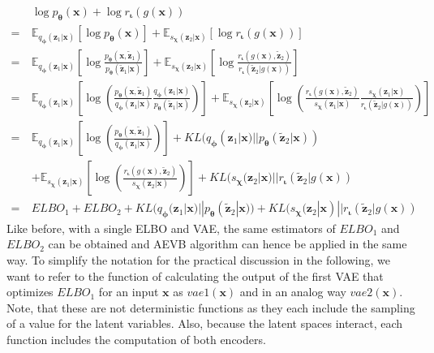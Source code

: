 \documentclass[12pt]{report}
\theoremstyle{definition}
\begin{document}
\begin{equation}
\begin{split}
 & \log p_{\pmb{\theta}}(\mathbf{x}) + \log r_{\pmb{\iota}}(g(\mathbf{x}))   \\
	= \ & \mathbb{E}_{q_{\pmb{\phi}}(\mathbf{z}_1|\mathbf{x})}\left[\log p_{\pmb{\theta}}(\mathbf{x})\right] + \mathbb{E}_{s_{\pmb{\chi}}(\mathbf{z}_2|\mathbf{x})}\left[\log r_{\pmb{\iota}}(g(\mathbf{x}))\right] \\
	= \ & \mathbb{E}_{q_{\pmb{\phi}}(\mathbf{z}_1|\mathbf{x})}\left[ \log \frac{p_{\pmb{\theta}}(\mathbf{x}, \tilde{\mathbf{z}}_1)}{p_{\pmb{\theta}}(\tilde{\mathbf{z}}_1|\mathbf{x})} \right]
	+ \mathbb{E}_{s_{\pmb{\chi}}(\mathbf{z}_2|\mathbf{x})}\left[ \log \frac{r_{\pmb{\iota}}(g(\mathbf{x}), \tilde{\mathbf{z}}_2)}{r_{\pmb{\iota}}(\tilde{\mathbf{z}}_2|g(\mathbf{x}))} \right] \\
	= \ & \mathbb{E}_{q_{\pmb{\phi}}(\mathbf{z}_1|\mathbf{x})}\left[ \log \left( \frac{p_{\pmb{\theta}}(\mathbf{x}, \tilde{\mathbf{z}}_1)}{q_{\pmb{\phi}}(\mathbf{z}_1|\mathbf{x})}\frac{q_{\pmb{\phi}}(\mathbf{z}_1|\mathbf{x})}{p_{\pmb{\theta}}(\tilde{\mathbf{z}}_1|\mathbf{x})}\right) \right]
	+ \mathbb{E}_{s_{\pmb{\chi}}(\mathbf{z}_2|\mathbf{x})}\left[ \log \left( \frac{r_{\pmb{\iota}}(g(\mathbf{x}), \tilde{\mathbf{z}}_2)}{s_{\pmb{\chi}}(\mathbf{z}_1|\mathbf{x})}\frac{s_{\pmb{\chi}}(\mathbf{z}_1|\mathbf{x})}{r_{\pmb{\iota}}(\tilde{\mathbf{z}}_2|g(\mathbf{x}))} \right) \right] \\
	= \ & \mathbb{E}_{q_{\pmb{\phi}}(\mathbf{z}_1|\mathbf{x})}\left[ \log\left(\frac{p_{\pmb{\theta}}(\mathbf{x}, \tilde{\mathbf{z}}_1)}{q_{\pmb{\phi}}(\mathbf{z}_1|\mathbf{x})}\right) \right] + KL(q_{\pmb{\phi}}(\mathbf{z}_1|\mathbf{x}) || p_{\pmb{\theta}}(\tilde{\mathbf{z}}_2| \mathbf{x})) \\
	& + \mathbb{E}_{s_{\pmb{\chi}}(\mathbf{z}_1|\mathbf{x})}\left[ \log\left(\frac{r_{\pmb{\iota}}(g(\mathbf{x}), \tilde{\mathbf{z}}_2)}{s_{\pmb{\chi}}(\mathbf{z}_2|\mathbf{x})}\right) \right] + KL(s_{\pmb{\chi}}(\mathbf{z}_2|\mathbf{x}) || r_{\pmb{\iota}}(\tilde{\mathbf{z}}_2| g(\mathbf{x})) \\
= \ & ELBO_1 + ELBO_2 + KL(q_{\pmb{\phi}}(\mathbf{z}_1|\mathbf{x}) || p_{\pmb{\theta}}(\tilde{\mathbf{z}}_2| \mathbf{x})) + KL(s_{\pmb{\chi}}(\mathbf{z}_2|\mathbf{x}) || r_{\pmb{\iota}}(\tilde{\mathbf{z}}_2| g(\mathbf{x}))
\end{split}
\end{equation}
Like before, with a single ELBO and VAE, the same estimators of $ELBO_1$ and $ELBO_2$ can be obtained and AEVB algorithm can hence be applied in the same way. To simplify the notation for the practical discussion in the following, we want to refer to the function of calculating the output of the first VAE that optimizes $ELBO_1$ for an input $\mathbf{x}$ as $vae1(\mathbf{x})$ and in an analog way $vae2(\mathbf{x})$. Note, that these are not deterministic functions as they each include the sampling of a value for the latent variables. Also, because the latent spaces interact, each function includes the computation of both encoders.
\end{document}
